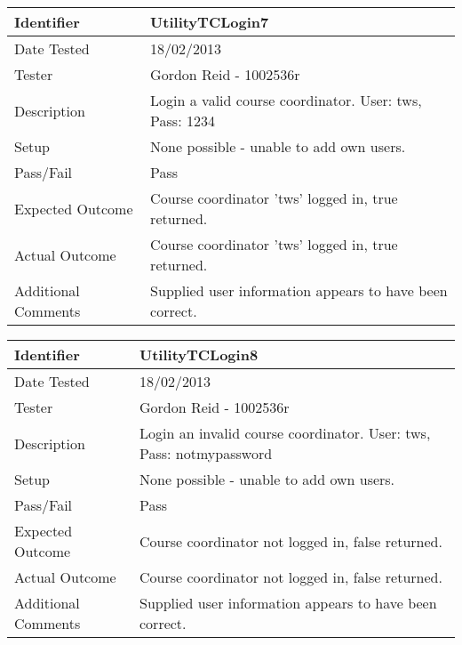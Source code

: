\documentclass[11pt]{l3deliverable}
\begin{document}
\begin{tabularx}{\textwidth}{|T|L|}
\hline
Identifier & UtilityTCLogin7\\
\hline
Date Tested & 18/02/2013\\
\hline
Tester & Gordon Reid - 1002536r\\
\hline
Description & Login a valid course coordinator. User: tws, Pass: 1234\\
\hline
Setup & None possible - unable to add own users.\\
\hline
Pass/Fail & Pass\\
\hline
Expected Outcome & Course coordinator 'tws' logged in, true returned.\\
\hline
Actual Outcome & Course coordinator 'tws' logged in, true returned.\\
\hline
Additional Comments & Supplied user information appears to have been correct.\\
\hline
\end{tabularx}

\vspace{2em}

\begin{tabularx}{\textwidth}{|T|L|}
\hline
Identifier & UtilityTCLogin8\\
\hline
Date Tested & 18/02/2013\\
\hline
Tester & Gordon Reid - 1002536r\\
\hline
Description & Login an invalid course coordinator. User: tws, Pass: 
notmypassword\\
\hline
Setup & None possible - unable to add own users.\\
\hline
Pass/Fail & Pass\\
\hline
Expected Outcome & Course coordinator not logged in, false returned.\\
\hline
Actual Outcome & Course coordinator not logged in, false returned.\\
\hline
Additional Comments & Supplied user information appears to have been correct.\\
\hline
\end{tabularx}

\vspace{2em}
\end{document}
